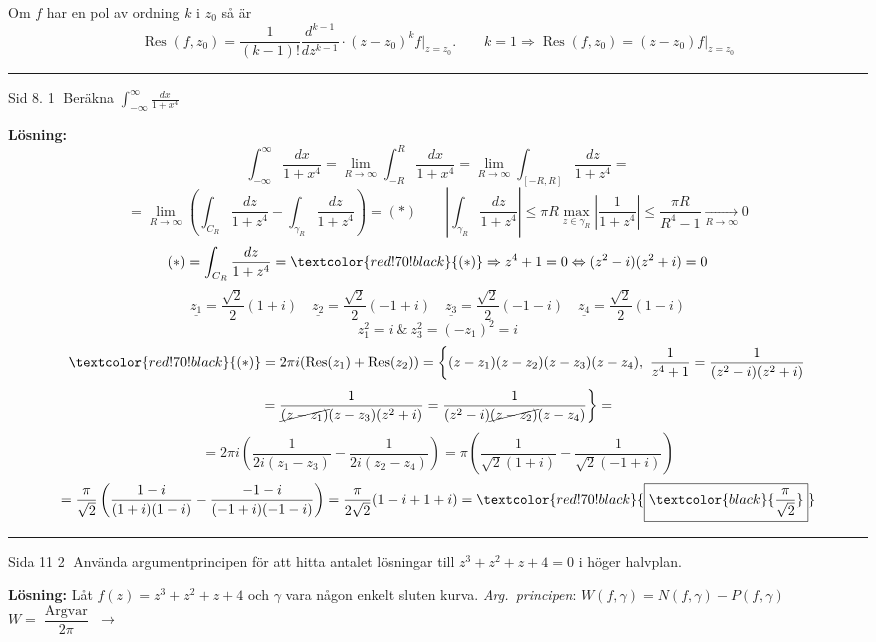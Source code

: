 \begin{theorem}[Sats]
Om $f$ har en pol av ordning $k$ i $z_0$ så är
\[ \operatorname{Res}(f, z_0) = \frac{1}{(k - 1)!} \frac{d^{k-1}}{dz^{k-1}} \cdot (z - z_0)^k f \Big|_{z = z_0}. \qquad k = 1 \Rightarrow \operatorname{Res}(f, z_0) = (z - z_0)f \Big|_{z = z_0} \]
\end{theorem}

\noindent\rule{\linewidth}{0.4pt}

Sid 8. \textcircled{1} Beräkna $\displaystyle\int_{-\infty}^\infty \frac{dx}{1 + x^4}$

\textbf{Lösning:}
\[ \int_{-\infty}^\infty \frac{dx}{1 + x^4} = \lim_{R \to \infty} \int_{-R}^R \frac{dx}{1 + x^4} = \lim_{R \to \infty} \int_{[-R, R]} \frac{dz}{1 + z^4} = \]
\[ = \lim_{R \to \infty}\left( \int_{C_R} \frac{dz}{1 + z^4} - \int_{\gamma_R} \frac{dz}{1 + z^4} \right) = (*) \qquad \left| \int_{\gamma_R} \frac{dz}{1 + z^4} \right| \le \pi R \max_{z \in \gamma_R} \left| \frac{1}{1 + z^4} \right| \le \frac{\pi R}{R^4 - 1} \xrightarrow[R \to \infty]{} 0 \]
\[ (*) = \int_{C_R} \frac{dz}{1 + z^4} = \textcolor{red!70!black}{(*)} \Rightarrow z^4 + 1 = 0 \Leftrightarrow (z^2 - i)(z^2 + i) = 0 \]
\[ \underline{z_1} = \frac{\sqrt{2}}{2}(1 + i) \quad \underline{z_2} = \frac{\sqrt{2}}{2}(-1 + i) \quad \underline{z_3} = \frac{\sqrt{2}}{2}(-1 - i) \quad \underline{z_4} = \frac{\sqrt{2}}{2}(1 - i) \]
\[ z_1^2 = i \ \& \ z_3^2 = (-z_1)^2 = i \]
\[ \textcolor{red!70!black}{(*)} = 2\pi i(\operatorname{Res}(z_1) + \operatorname{Res}(z_2)) = \left\{ (z - z_1)(z - z_2)(z - z_3)(z - z_4),\ \frac{1}{z^4 + 1} = \frac{1}{(z^2 - i)(z^2 + i)} \right. \]
\[ \left. = \frac{1}{\cancel{(z - z_1)}(z - z_3)(z^2 + i)} = \frac{1}{(z^2 - i)\cancel{(z - z_2)}(z - z_4)} \right\} = \]
\[ = 2\pi i\left( \frac{1}{2i(z_1 - z_3)} - \frac{1}{2i(z_2 - z_4)} \right) = \pi\left( \frac{1}{\sqrt{2}(1 + i)} - \frac{1}{\sqrt{2}(-1 + i)} \right) \]
\[ = \frac{\pi}{\sqrt{2}}\left( \frac{1 - i}{(1 + i)(1 - i)} - \frac{-1 - i}{(-1 + i)(-1 - i)} \right) = \frac{\pi}{2\sqrt{2}}(1 - i + 1 + i) = \textcolor{red!70!black}{\boxed{\textcolor{black}{\frac{\pi}{\sqrt{2}}}}} \]

\noindent\rule{\linewidth}{0.4pt}

Sida 11 \textcircled{2} Använda argumentprincipen för att hitta antalet lösningar till $z^3 + z^2 + z + 4 = 0$ i höger halvplan.

\textbf{Lösning:} Låt $f(z) = z^3 + z^2 + z + 4$ och $\gamma$ vara någon enkelt sluten kurva. \emph{Arg.\ principen}: $W(f, \gamma) = N(f, \gamma) - P(f, \gamma)$
$W = \dfrac{\operatorname{Arg var}}{2\pi}$
\hfill $\longrightarrow$
